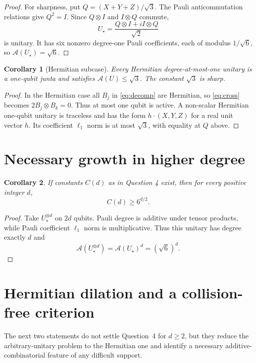 \documentclass[11pt]{article}
\newtheorem{corollary}{Corollary}
\newcommand{\A}{\mathcal A}
\begin{document}
\begin{proof}
For sharpness, put $Q=(X+Y+Z)/\sqrt3$.  The Pauli anticommutation relations
give $Q^2=I$.  Since $Q\otimes I$ and $I\otimes Q$ commute,
\begin{equation}\label{eq:extremizer}
 U_\star=\frac{Q\otimes I+iI\otimes Q}{\sqrt2}
\end{equation}
is unitary.  It has six nonzero degree-one Pauli coefficients, each of
modulus $1/\sqrt6$, so $\A(U_\star)=\sqrt6$.
\end{proof}

\begin{corollary}[Hermitian subcase]
Every Hermitian degree-at-most-one unitary is a one-qubit junta and satisfies
$\A(U)\le\sqrt3$.  The constant $\sqrt3$ is sharp.
\end{corollary}

\begin{proof}
In the Hermitian case all $B_j$ in \eqref{eq:decomp} are Hermitian, so
\eqref{eq:cross} becomes $2B_j\otimes B_k=0$.  Thus at most one qubit is
active.  A non-scalar Hermitian one-qubit unitary is traceless and has the
form $h\cdot(X,Y,Z)$ for a real unit vector $h$.  Its coefficient $\ell_1$
norm is at most $\sqrt3$, with equality at $Q$ above.
\end{proof}

\section{Necessary growth in higher degree}

\begin{corollary}\label{cor:lower}
If constants $C(d)$ as in Question 4 exist, then for every positive integer
$d$,
\[
 C(d)\ge 6^{d/2}.
\]
\end{corollary}

\begin{proof}
Take $U_\star^{\otimes d}$ on $2d$ qubits.  Pauli degree is additive under
tensor products, while Pauli coefficient $\ell_1$ norm is multiplicative.
Thus this unitary has degree exactly $d$ and
\[
 \A(U_\star^{\otimes d})=\A(U_\star)^d=(\sqrt6)^d.
\]
\end{proof}

\section{Hermitian dilation and a collision-free criterion}

The next two statements do not settle Question~4 for $d\ge2$, but they reduce
the arbitrary-unitary problem to the Hermitian one and identify a necessary
additive-combinatorial feature of any difficult support.
\end{document}
